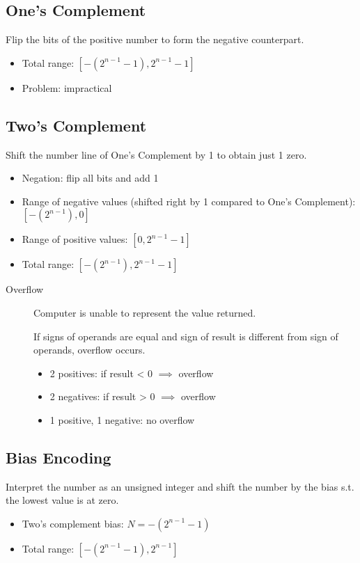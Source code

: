 \subsection{One's Complement}
Flip the bits of the positive number to form the negative counterpart.
\begin{itemize}
	\item Total range: \([-(2^{n-1}-1), 2^{n-1}-1]\)
	\item Problem: impractical
\end{itemize}

\subsection{Two's Complement} 
Shift the number line of One's Complement by 1 to obtain just 1 zero.
\begin{itemize}
	\item Negation: flip all bits and add 1
	\item Range of negative values (shifted right by 1 compared to One's Complement): \([-(2^{n-1}), 0]\)
	\item Range of positive values: \([0, 2^{n-1}-1]\)
	\item Total range: \([-(2^{n-1}), 2^{n-1}-1]\)
\end{itemize}

\begin{description}
	\item[Overflow] Computer is unable to represent the value returned.
	
	If signs of operands are equal and sign of result is different from sign of operands, overflow occurs. 
	\begin{itemize}
	    \item 2 positives: if result < 0 \(\implies\) overflow
	    \item 2 negatives: if result > 0 \(\implies\) overflow
	    \item 1 positive, 1 negative: no overflow
	\end{itemize}
\end{description}

\subsection{Bias Encoding}
Interpret the number as an unsigned integer and shift the number by the bias s.t. the lowest value is at zero.
\begin{itemize}
    \item Two's complement bias: \(N = -(2^{n-1}-1)\)
    \item Total range: \([-(2^{n-1}-1), 2^{n-1}]\)
\end{itemize}

